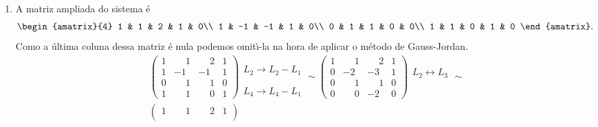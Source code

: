\begin{exemplo}
\begin{solucao}
\begin{enumerate}
            \item A matriz ampliada do sistema \'e
                \[
                    \begin{amatrix}{4}
                        1 & 1 & 2 & 1 & 0\\
                        1 & -1 & -1 & 1 & 0\\
                        0 & 1 & 1 & 0 & 0\\
                        1 & 1 & 0 & 1 & 0
                    \end{amatrix}.
                \]
            Como a \'ultima coluna dessa matriz \'e nula podemos omit{\'\i}-la na hora de aplicar o m\'etodo de Gauss-Jordan.
            \begin{align*}
                &\begin{pmatrix}
                    1 &\phantom{-} 1 &\phantom{-} 2 & 1\\
                    1 & -1 & -1 & 1\\
                    0 &\phantom{-} 1 &\phantom{-} 1 & 0\\
                    1 &\phantom{-} 1 &\phantom{-} 0 & 1
                \end{pmatrix}
                \begin{array}{l}
                    \phantom{x}\\L_2 \to L_2 - L_1\\\phantom{x}\\L_4 \to L_4 - L_1
                \end{array}\sim
                \begin{pmatrix}
                    1 &\phantom{-} 1 &\phantom{-} 2 & 1\\
                    0 & -2 & -3 & 1\\
                    0 &\phantom{-} 1 &\phantom{-} 1 & 0\\
                    0 &\phantom{-} 0 & -2 & 0
                \end{pmatrix}
                \begin{array}{l}
                    \phantom{x}\\L_2 \leftrightarrow L_3\\\phantom{x}\\\phantom{x}
                \end{array}\sim\\
                &\begin{pmatrix}
                    1 &\phantom{-} 1 &\phantom{-} 2 & 1\\

\end{pmatrix}
\end{align*}
\end{enumerate}
\end{solucao}
\end{exemplo}

